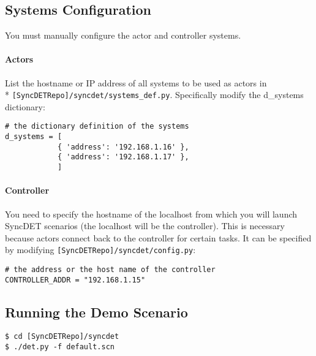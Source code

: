 \subsection{Systems Configuration}
You must manually configure the actor and controller systems. 

\paragraph{Actors} 
List the hostname or IP address of all systems to be used as actors in \\*
{\tt [SyncDETRepo]/syncdet/systems\_def.py}. Specifically modify the d\_systems
dictionary:
\begin{verbatim}
# the dictionary definition of the systems
d_systems = [
            { 'address': '192.168.1.16' },
            { 'address': '192.168.1.17' },
            ]
\end{verbatim}

\paragraph{Controller} 
You need to specify the hostname of the localhost from which you will launch
SyncDET scenarios (the localhost will be the controller). This is necessary
because actors connect back to the controller for certain tasks. It can be
specified by modifying {\tt [SyncDETRepo]/syncdet/config.py}:
\begin{verbatim}
# the address or the host name of the controller
CONTROLLER_ADDR = "192.168.1.15"
\end{verbatim}

\subsection{Running the Demo Scenario}
\begin{verbatim}
$ cd [SyncDETRepo]/syncdet
$ ./det.py -f default.scn
\end{verbatim}

